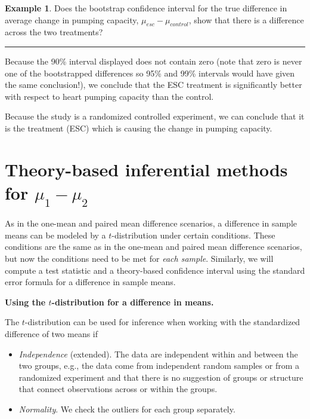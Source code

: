 \documentclass[
  10pt,
  openany]{book}
\providecommand{\tightlist}{%
  \setlength{\itemsep}{0pt}\setlength{\parskip}{0pt}}
\theoremstyle{definition}
\theoremstyle{definition}
\newtheorem{example}{Example}[chapter]
\theoremstyle{definition}
\theoremstyle{definition}
\theoremstyle{remark}
\begin{document}
\begin{example}
Does the bootstrap confidence interval for the true difference in average change in pumping capacity, \(\mu_{esc} - \mu_{control}\), show that there is a difference across the two treatments?

\begin{center}\rule{0.5\linewidth}{0.5pt}\end{center}

Because the 90\% interval displayed does not contain zero (note that zero is never one of the bootstrapped differences so 95\% and 99\% intervals would have given the same conclusion!), we conclude that the ESC treatment is significantly better with respect to heart pumping capacity than the control.

Because the study is a randomized controlled experiment, we can conclude that it is the treatment (ESC) which is causing the change in pumping capacity.
\end{example}

\section{\texorpdfstring{Theory-based inferential methods for \(\mu_1 - \mu_2\)}{Theory-based inferential methods for \textbackslash mu\_1 - \textbackslash mu\_2}}\label{math2samp}

As in the one-mean and paired mean difference scenarios, a difference in sample means can be modeled by a \(t\)-distribution under certain conditions. These conditions are the same as in the one-mean and paired mean difference scenarios, but now the conditions need to be met for \emph{each sample}. Similarly, we will compute a test statistic and a theory-based confidence interval using the standard error formula for a difference in sample means.


\textbf{Using the \(t\)-distribution for a difference in means.}

The \(t\)-distribution can be used for inference when working
with the standardized difference of two means if

\begin{itemize}
\tightlist
\item
  \emph{Independence} (extended).
  The data are independent within and between
  the two groups, e.g., the data come from
  independent random samples or from a
  randomized experiment and that there is no suggestion of groups or structure that connect observations across or within the groups.\\
\item
  \emph{Normality}.
  We check the outliers for
  each group separately.
\end{itemize}
\end{document}
